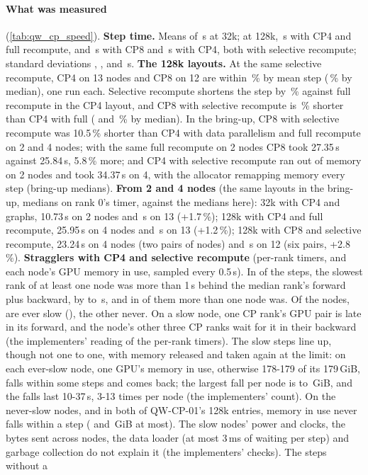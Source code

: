 \paragraph{What was measured} (\cref{tab:qw_cp_speed}). \textbf{Step time.} Means of \TriQwCpStepThirtyTwo\,s at 32k; at 128k, \TriQwCpStepCpFour\,s with CP4 and full recompute, and \TriQwCpStepCpEight\,s with CP8 and \TriQwCpStepCpFourSel\,s with CP4, both with selective recompute; standard deviations \TriQwCpSdThirtyTwo, \TriQwCpSdCpFour, \TriQwCpSdCpEight{} and \TriQwCpSdCpFourSel\,s. \textbf{The 128k layouts.} At the same selective recompute, CP4 on 13 nodes and CP8 on 12 are within \TriQwCpSelEight\,\% by mean step (\TriQwCpSelEightMed\,\% by median), one run each. Selective recompute shortens the step by \TriQwCpSelShorter\,\% against full recompute in the CP4 layout, and CP8 with selective recompute is \TriQwCpEightShorter\,\% shorter than CP4 with full (\TriQwCpSelShorterMed{} and \TriQwCpEightShorterMed\,\% by median). In the bring-up, CP8 with selective recompute was 10.5\,\% shorter than CP4 with data parallelism and full recompute on 2 and 4 nodes; with the same full recompute on 2 nodes CP8 took 27.35\,s against 25.84\,s, 5.8\,\% more; and CP4 with selective recompute ran out of memory on 2 nodes and took 34.37\,s on 4, with the allocator remapping memory every step (bring-up medians). \textbf{From 2 and 4 nodes} (the same layouts in the bring-up, medians on rank 0's timer, against the medians here): 32k with CP4 and graphs, 10.73\,s on 2 nodes and \TriQwCpMedThirtyTwo\,s on 13 (+1.7\,\%); 128k with CP4 and full recompute, 25.95\,s on 4 nodes and \TriQwCpMedCpFour\,s on 13 (+1.2\,\%); 128k with CP8 and selective recompute, 23.24\,s on 4 nodes (two pairs of nodes) and \TriQwCpMedCpEight\,s on 12 (six pairs, +2.8\,\%). \textbf{Stragglers with CP4 and selective recompute} (per-rank timers, and each node's GPU memory in use, sampled every 0.5\,s). In \TriQwCpSlowSteps{} of the \TriQwCpMeasured{} steps, the slowest rank of at least one node was more than 1\,s behind the median rank's forward plus backward, by \TriQwCpBehindLo{} to \TriQwCpBehindHi\,s, and in \TriQwCpSlowMulti{} of them more than one node was. Of the \TriQwCpNodesCpFourSel{} nodes, \TriQwCpSlowNodes{} are ever slow (\TriQwCpSlowNodeList), the other \TriQwCpFastNodes{} never. On a slow node, one CP rank's GPU pair is late in its forward, and the node's other three CP ranks wait for it in their backward (the implementers' reading of the per-rank timers). The slow steps line up, though not one to one, with memory released and taken again at the limit: on each ever-slow node, one GPU's memory in use, otherwise 178-179 of its 179\,GiB, falls within some steps and comes back; the largest fall per node is \TriQwCpDropLo{} to \TriQwCpDropHi\,GiB, and the falls last 10-37\,s, 3-13 times per node (the implementers' count). On the never-slow nodes, and in both of QW-CP-01's 128k entries, memory in use never falls within a step (\TriQwCpDropOther{} and \TriQwCpDropOne\,GiB at most). The slow nodes' power and clocks, the bytes sent across nodes, the data loader (at most 3\,ms of waiting per step) and garbage collection do not explain it (the implementers' checks). The \TriQwCpCleanSteps{} steps without a 